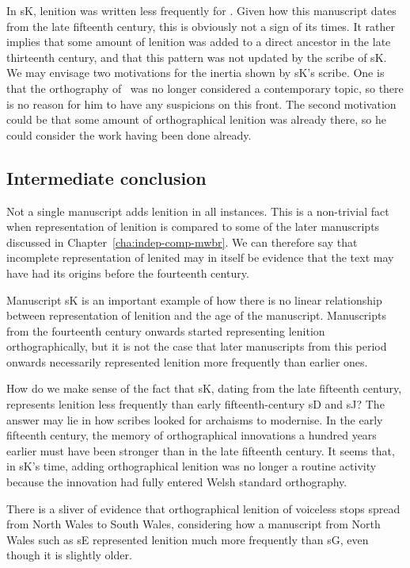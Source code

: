 In \gls{sK}, lenition was written less frequently for . Given how this manuscript dates from the late fifteenth century, this is obviously not a sign of its times. It rather implies that some amount of lenition was added to a direct ancestor in the late thirteenth century, and that this pattern was not updated by the scribe of \gls{sK}. We may envisage two motivations for the inertia shown by \gls{sK}'s scribe. One is that the orthography of \lT\ was no longer considered a contemporary topic, so there is no reason for him to have any suspicions on this front. The second motivation could be that some amount of orthographical lenition was already there, so he could consider the work having been done already.

\subsection{Intermediate conclusion}
\label{sec:interm-concl}
Not a single manuscript adds lenition in all instances. This is a non-trivial fact when representation of lenition is compared to some of the later  manuscripts discussed in Chapter~\ref{cha:indep-comp-mwbr}. We can therefore say that incomplete representation of lenited  may in itself be evidence that the text may have had its origins before the fourteenth century.

Manuscript \gls{sK} is an important example of how there is no linear relationship between representation of lenition and the age of the manuscript. Manuscripts from the fourteenth century onwards started representing lenition orthographically, but it is not the case that later manuscripts from this period onwards necessarily represented lenition more frequently than earlier ones.
  
How do we make sense of the fact that \gls{sK}, dating from the late fifteenth century, represents lenition less frequently than early fifteenth-century \gls{sD} and \gls{sJ}? The answer may lie in how scribes looked for archaisms to modernise. In the early fifteenth century, the memory of orthographical innovations a hundred years earlier must have been stronger than in the late fifteenth century. It seems that, in \gls{sK}'s time, adding orthographical lenition was no longer a routine activity because the innovation had fully entered Welsh standard orthography.

There is a sliver of evidence that orthographical lenition of voiceless stops spread from North Wales to South Wales, considering how a manuscript from North Wales such as \gls{sE} represented lenition much more frequently than \gls{sG}, even though it is slightly older.

